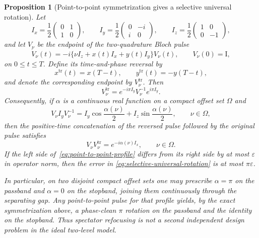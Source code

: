 \documentclass[11pt]{article}
\newtheorem{proposition}[theorem]{Proposition}
\theoremstyle{remark}
\newcommand{\Id}{\mathrm I}
\begin{document}
\begin{proposition}[Point-to-point symmetrization gives a selective universal rotation]
\label{prop:pp-to-ur-symmetrization}
Let
\[
 I_x=\frac12\begin{pmatrix}0&1\\1&0\end{pmatrix},
 \qquad
 I_y=\frac12\begin{pmatrix}0&-i\\i&0\end{pmatrix},
 \qquad
 I_z=\frac12\begin{pmatrix}1&0\\0&-1\end{pmatrix},
\]
and let $V_\nu$ be the endpoint of the two-quadrature Bloch pulse
\begin{equation}
 \dot V_\nu(t)
 =-i\{\nu I_z+x(t)I_x+y(t)I_y\}V_\nu(t),
 \qquad V_\nu(0)=\Id ,
 \label{eq:bloch-pp-pulse}
\end{equation}
on $0\leq t\leq T$.  Define its time-and-phase reversal by
\[
 x^{\mathrm{tr}}(t)=x(T-t),
 \qquad
 y^{\mathrm{tr}}(t)=-y(T-t),
\]
and denote the corresponding endpoint by $V_\nu^{\mathrm{tr}}$.  Then
\begin{equation}
 V_\nu^{\mathrm{tr}}
 =e^{-i\pi I_y}V_\nu^{-1}e^{i\pi I_y}.
 \label{eq:time-phase-reversal-identity}
\end{equation}
Consequently, if $\alpha$ is a continuous real function on a compact offset
set $\Omega$ and
\begin{equation}
 V_\nu I_yV_\nu^{-1}
 =
 I_y\cos\frac{\alpha(\nu)}2
 +I_z\sin\frac{\alpha(\nu)}2,
 \qquad \nu\in\Omega,
 \label{eq:point-to-point-profile}
\end{equation}
then the positive-time concatenation of the reversed pulse followed by the
original pulse satisfies
\begin{equation}
 V_\nu V_\nu^{\mathrm{tr}}
 =e^{-i\alpha(\nu)I_x},
 \qquad \nu\in\Omega.
 \label{eq:selective-universal-rotation}
\end{equation}
If the left side of~\eqref{eq:point-to-point-profile} differs from its right
side by at most $\varepsilon$ in operator norm, then the error in
\eqref{eq:selective-universal-rotation} is at most $\pi\varepsilon$.

In particular, on two disjoint compact offset sets one may prescribe
$\alpha=\pi$ on the passband and $\alpha=0$ on the stopband, joining them
continuously through the separating gap.  Any point-to-point pulse for that
profile yields, by the exact symmetrization above, a phase-clean
$\pi$ rotation on the passband and the identity on the stopband.  Thus
spectator refocusing is not a second independent design problem in the ideal
two-level model.
\end{proposition}
\end{document}
